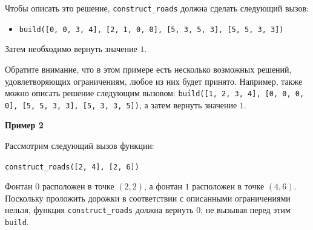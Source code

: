 Чтобы описать это решение, \texttt{construct\_roads} должна сделать следующий вызов:
\begin{itemize}
\item \texttt{build([0, 0, 3, 4], [2, 1, 0, 0], [5, 3, 5, 3], [5, 5, 3, 3])}
\end{itemize}

Затем необходимо вернуть значение $1$.

Обратите внимание, что в этом примере есть несколько возможных решений, удовлетворяющих ограничениям, любое из них будет принято.
Например, также можно описать решение следующим вызовом: \texttt{build([1, 2, 3, 4], [0, 0, 0, 0], [5, 5, 3, 3], [5, 3, 3, 5])}, а затем вернуть значение $1$.

\textbf{Пример 2}

Рассмотрим следующий вызов функции:

\texttt{construct\_roads([2, 4], [2, 6])}

Фонтан $0$ расположен в точке $(2,2)$, а фонтан $1$ расположен в точке $(4,6)$. Поскольку проложить дорожки в соответствии с описанными ограничениями нельзя, функция \texttt{construct\_roads} должна вернуть $0$, не вызывая перед этим \texttt{build}.
